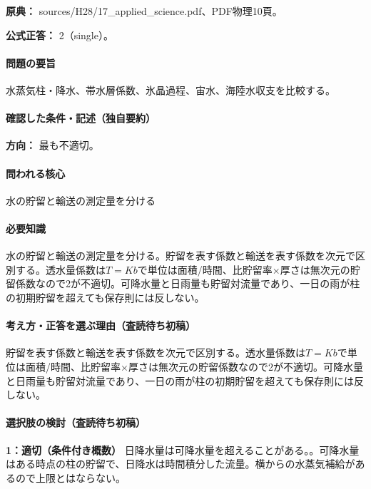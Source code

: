 \noindent\textbf{原典：} sources/H28/17\_applied\_science.pdf、PDF物理10頁。

\textbf{公式正答：} 2（single）。

\paragraph{問題の要旨} 水蒸気柱・降水、帯水層係数、氷晶過程、宙水、海陸水収支を比較する。

\paragraph{確認した条件・記述（独自要約）}\mbox{}\par

\noindent\textbf{方向：} 最も不適切。\par

\paragraph{問われる核心} 水の貯留と輸送の測定量を分ける

\paragraph{必要知識} 水の貯留と輸送の測定量を分ける。貯留を表す係数と輸送を表す係数を次元で区別する。透水量係数は\(T=Kb\)で単位は面積/時間、比貯留率×厚さは無次元の貯留係数なので2が不適切。可降水量と日雨量も貯留対流量であり、一日の雨が柱の初期貯留を超えても保存則には反しない。

\paragraph{考え方・正答を選ぶ理由（査読待ち初稿）} 貯留を表す係数と輸送を表す係数を次元で区別する。透水量係数は\(T=Kb\)で単位は面積/時間、比貯留率×厚さは無次元の貯留係数なので2が不適切。可降水量と日雨量も貯留対流量であり、一日の雨が柱の初期貯留を超えても保存則には反しない。

\paragraph{選択肢の検討（査読待ち初稿）}\mbox{}\par

\noindent\textbf{1：適切（条件付き概数）} 日降水量は可降水量を超えることがある。。可降水量はある時点の柱の貯留で、日降水は時間積分した流量。横からの水蒸気補給があるので上限とはならない。\par

